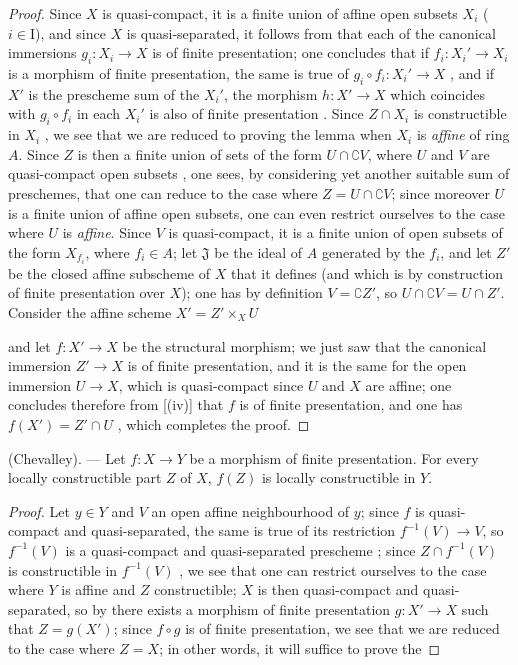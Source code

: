 \begin{proof}
Since $X$ is quasi-compact, it is a finite union of affine open subsets $X_i$ ($i\in\mathrm{I}$), and since $X$ is quasi-separated, it follows from  that each of the canonical immersions $g_i:X_i\to X$ is of finite presentation; one concludes that if $f_i:X_i'\to X_i$ is a morphism of finite presentation, the same is true of $g_i\circ f_i:X_i'\to X$ , and if $X'$ is the prescheme sum of the $X_i'$, the morphism $h:X'\to X$ which coincides with $g_i\circ f_i$ in each $X_i'$ is also of finite presentation .
Since $Z\cap X_i$ is constructible in $X_i$ , we see that we are reduced to proving the lemma when $X_i$ is \emph{affine} of ring $A$.
Since $Z$ is then a finite union of sets of the form $U\cap\complement V$, where $U$ and $V$ are quasi-compact open subsets , one sees, by considering yet another suitable sum of preschemes, that one can reduce to the case where $Z=U\cap\complement V$; since moreover $U$ is a finite union of affine open subsets, one can even restrict ourselves to the case where $U$ is \emph{affine}.
Since $V$ is quasi-compact, it is a finite union of open subsets of the form $X_{f_i}$, where $f_i\in A$; let $\mathfrak{J}$ be the ideal of $A$ generated by the $f_i$, and let $Z'$ be the closed affine subscheme of $X$ that it defines (and which is by construction of finite presentation over $X$); one has by definition $V=\complement Z'$, so $U\cap\complement V=U\cap Z'$.
Consider the affine scheme $X'=Z'\times_X U$


and let $f:X'\to X$ be the structural morphism; we just saw that the canonical immersion $Z'\to X$ is of finite presentation, and it is the same for the open immersion $U\to X$, which is quasi-compact since $U$ and $X$ are affine; one concludes therefore from [(iv)] that $f$ is of finite presentation, and one has $f(X')=Z'\cap U$ , which completes the proof.
\end{proof}

\begin{theorem}[1.8.4]
\label{IV.1.8.4}
\textup{(Chevalley).} ---
Let $f:X\to Y$ be a morphism of finite presentation.
For every locally constructible part $Z$ of $X$, $f(Z)$ is locally constructible in $Y$.
\end{theorem}

\begin{proof}
Let $y\in Y$ and $V$ an open affine neighbourhood of $y$; since $f$ is quasi-compact and quasi-separated, the same is true of its restriction $f^{-1}(V)\to V$, so $f^{-1}(V)$ is a quasi-compact and quasi-separated prescheme ; since $Z\cap f^{-1}(V)$ is constructible in $f^{-1}(V)$ , we see that one can restrict ourselves to the case where $Y$ is affine and $Z$ constructible; $X$ is then quasi-compact and quasi-separated, so by  there exists a morphism of finite presentation $g:X'\to X$ such that $Z=g(X')$; since $f\circ g$ is of finite presentation, we see that we are reduced to the case where $Z=X$; in other words, it will suffice to prove the
\end{proof}

